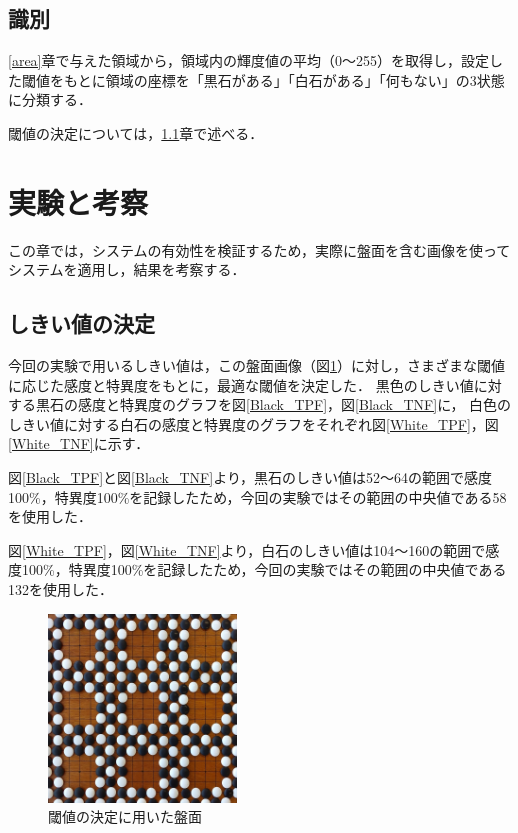 \documentclass[openright]{nitocs}
\numberwithin{equation}{section}
\begin{document}
        \subsection{識別} \label{identify}  
            \ref{area}章で与えた領域から，領域内の輝度値の平均（0～255）を取得し，設定した閾値をもとに領域の座標を「黒石がある」「白石がある」「何もない」の3状態に分類する．
            
            閾値の決定については，\ref{threshold}章で述べる．

    \section{実験と考察} %
        この章では，システムの有効性を検証するため，実際に盤面を含む画像を使ってシステムを適用し，結果を考察する．

        \subsection{しきい値の決定} \label{threshold}
            今回の実験で用いるしきい値は，この盤面画像（図\ref{DSC0087}）に対し，さまざまな閾値に応じた感度と特異度をもとに，最適な閾値を決定した．
            黒色のしきい値に対する黒石の感度と特異度のグラフを図\ref{Black_TPF}，図\ref{Black_TNF}に，
            白色のしきい値に対する白石の感度と特異度のグラフをそれぞれ図\ref{White_TPF}，図\ref{White_TNF}に示す．

            図\ref{Black_TPF}と図\ref{Black_TNF}より，黒石のしきい値は52～64の範囲で感度100\%，特異度100\%を記録したため，今回の実験ではその範囲の中央値である58を使用した．

            図\ref{White_TPF}，図\ref{White_TNF}より，白石のしきい値は104～160の範囲で感度100\%，特異度100\%を記録したため，今回の実験ではその範囲の中央値である132を使用した．
            \begin{figure} %
                \begin{center}
                \includegraphics[width=50mm,height=50mm]{DSC_0087/boardImg.jpg} 
                \caption{閾値の決定に用いた盤面}
                \label{DSC0087}
                \end{center}
            \end{figure}
\end{document}
